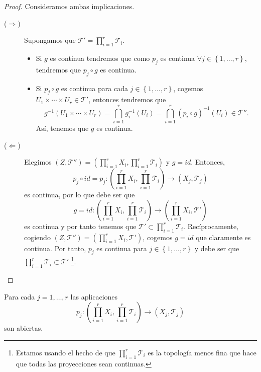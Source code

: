 \begin{proof}
Consideramos ambas implicaciones.
\begin{description}
\item[($\displaystyle \Rightarrow $)] Supongamos que $\displaystyle \mathcal{T}' = \prod^{r}_{i = 1}\mathcal{T}_{i} $. 
	\begin{itemize}
		\item Si $\displaystyle g $ es continua tendremos que como $\displaystyle p_{j} $ es continua $\displaystyle \forall j \in \left\{ 1, \ldots, r\right\}  $, tendremos que $\displaystyle p_{j}\circ g $ es continua. 
		\item Si $\displaystyle p_{j}\circ g $ es continua para cada $\displaystyle j \in \left\{ 1, \ldots, r\right\}  $, cogemos $\displaystyle U_{1} \times \cdots \times U_{r} \in \mathcal{T}' $, entonces tendremos que 
			\[g^{-1}\left(U_{1} \times \cdots \times U_{r}\right)= \bigcap_{i = 1}^{r}g_{i}^{-1}\left(U_{i}\right) = \bigcap_{i = 1}^{r}\left(p_{i}\circ g\right)^{-1}\left(U_{i}\right) \in \mathcal{T}'' .\]
		Así, tenemos que $\displaystyle g $ es continua.
	\end{itemize}
\item[($\displaystyle \Leftarrow $)] Elegimos $\displaystyle \left(Z, \mathcal{T}''\right)=\left(\prod^{r}_{i = 1}X_{i}, \prod^{r}_{i = 1}\mathcal{T}_{i}\right) $ y $\displaystyle g = id $. Entonces, 
	\[p_{j}\circ id = p_{j} : \left(\prod^{r}_{i = 1}X_{i}, \prod^{r}_{i = 1}\mathcal{T}_{i}\right) \to \left(X_{j}, \mathcal{T}_{j}\right) \]
	es continua, por lo que debe ser que 
	\[g = id : \left(\prod^{r}_{i = 1}X_{i}, \prod^{r}_{i = 1}\mathcal{T}_{i}\right)\to \left(\prod^{r}_{i = 1}X_{i}, \mathcal{T}'\right) \]
	es continua y por tanto tenemos que $\displaystyle \mathcal{T}' \subset \prod^{r}_{i = 1}\mathcal{T}_{i} $. Recíprocamente, cogiendo $\displaystyle \left(Z, \mathcal{T}''\right)=\left(\prod^{r}_{i = 1}X_{i}, \mathcal{T}'\right) $, cogemos $\displaystyle g = id $ que claramente es continua. Por tanto, $\displaystyle p_{j} $ es continua para $\displaystyle j \in \left\{ 1, \ldots, r\right\}  $ y debe ser que $\displaystyle \prod^{r}_{i = 1}\mathcal{T}_{i} \subset \mathcal{T}' $ \footnote{Estamos usando el hecho de que $\displaystyle \prod^{r}_{i = 1}\mathcal{T}_{i} $ es la topología menos fina que hace que todas las proyecciones sean continuas.}. 
\end{description}
\end{proof}
\begin{prop}
	Para cada $\displaystyle j = 1, \ldots, r $ las aplicaciones 
	\[ p_{j} : \left(\prod^{r}_{i = 1}X_{i}, \prod^{r}_{i = 1}\mathcal{T}_{i}\right) \to \left(X_{j}, \mathcal{T}_{j}\right)\]
	son abiertas.  
\end{prop}
